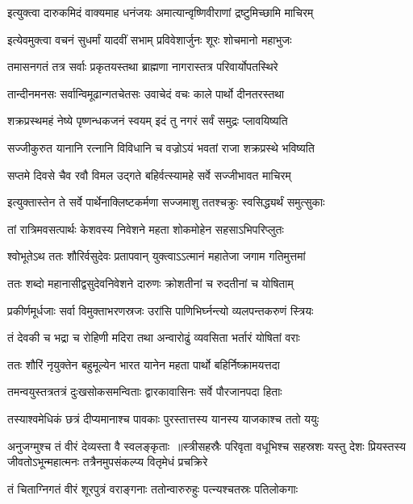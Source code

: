 \twolineshloka
{इत्युक्त्वा दारुकमिदं वाक्यमाह धनंजयः}
{अमात्यान्वृष्णिवीराणां द्रष्टुमिच्छामि माचिरम्}


\twolineshloka
{इत्येवमुक्त्वा वचनं सुधर्मां यादवीं सभाम्}
{प्रविवेशार्जुनः शूरः शोचमानो महाभुजः}


\twolineshloka
{तमासनगतं तत्र सर्वाः प्रकृतयस्तथा}
{ब्राह्मणा नागरास्तत्र परिवार्योपतस्थिरे}


\twolineshloka
{तान्दीनमनसः सर्वान्विमूढान्गतचेतसः}
{उवाचेदं वचः काले पार्थो दीनतरस्तथा}


\twolineshloka
{शक्रप्रस्थमहं नेष्ये पृष्णन्धकजनं स्वयम्}
{इदं तु नगरं सर्वं समुद्रः प्लावयिष्यति}


\twolineshloka
{सज्जीकुरुत यानानि रत्नानि विविधानि च}
{वज्रोऽयं भवतां राजा शक्रप्रस्थे भविष्यति}


\twolineshloka
{सप्तमे दिवसे चैव रवौ विमल उद्गते}
{बहिर्वत्स्यामहे सर्वे सज्जीभावत माचिरम्}


\twolineshloka
{इत्युक्तास्तेन ते सर्वे पार्थेनाक्लिष्टकर्मणा}
{सज्जमाशु ततश्चक्रुः स्वसिद्ध्यर्थं समुत्सुकाः}


\twolineshloka
{तां रात्रिमवसत्पार्थः केशवस्य निवेशने}
{महता शोकमोहेन सहसाऽभिपरिप्लुतः}


\twolineshloka
{श्वोभूतेऽथ ततः शौरिर्वसुदेवः प्रतापवान्}
{युक्त्वाऽऽत्मानं महातेजा जगाम गतिमुत्तमां}


\twolineshloka
{ततः शब्दो महानासीद्वसुदेवनिवेशने}
{दारुणः क्रोशतीनां च रुदतीनां च योषिताम्}


\threelineshloka
{प्रकीर्णमूर्धजाः सर्वा विमुक्ताभरणस्रजः}
{उरांसि पाणिभिर्घ्नन्त्यो व्यलपन्तकरुणं स्त्रियः}
{}


\twolineshloka
{तं देवकी च भद्रा च रोहिणी मदिरा तथा}
{अन्वारोढुं व्यवसिता भर्तारं योषितां वराः}


\twolineshloka
{ततः शौरिं नृयुक्तेन बहुमूल्येन भारत}
{यानेन महता पार्थो बहिर्निष्क्रामयत्तदा}


\twolineshloka
{तमन्वयुस्तत्रतत्रं दुःखसोकसमन्विताः}
{द्वारकावासिनः सर्वे पौरजानपदा हिताः}


\twolineshloka
{तस्याश्वमेधिकं छत्रं दीप्यमानाश्च पावकाः}
{पुरस्तात्तस्य यानस्य याजकाश्च ततो ययुः}


अनुजग्मुश्च तं वीरं देव्यस्ता वै स्वलङ्कृताः ॥स्त्रीसहस्रैः परिवृता वधूभिश्च सहस्रशः
\twolineshloka
{यस्तु देशः प्रियस्तस्य जीवतोऽभून्महात्मनः}
{तत्रैनमुपसंकल्प्य वितृमेधं प्रचक्रिरे}


\twolineshloka
{तं चिताग्निगतं वीरं शूरपुत्रं वराङ्गनाः}
{ततोन्वारुरुहुः पत्न्यश्चतस्रः पतिलोकगाः}


